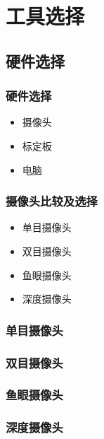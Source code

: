 \documentclass[aspectratio=43]{beamer}
\begin{document}
	
\section{工具选择}

\subsection{硬件选择}

\begin{frame}
	\frametitle{硬件选择}
	\begin{itemize}
		\item 摄像头
		\item 标定板
		\item 电脑
	\end{itemize}
\end{frame}

\begin{frame}
	\frametitle{摄像头比较及选择}	
	\begin{itemize}
		\item 单目摄像头
		\item 双目摄像头
		\item 鱼眼摄像头
		\item 深度摄像头	
	\end{itemize}	
\end{frame}	

\begin{frame}
	\frametitle{单目摄像头}	
\end{frame}	

\begin{frame}
	\frametitle{双目摄像头}	
\end{frame}	

\begin{frame}
	\frametitle{鱼眼摄像头}	
\end{frame}	

\begin{frame}
	\frametitle{深度摄像头}	
\end{frame}	
\end{document}
